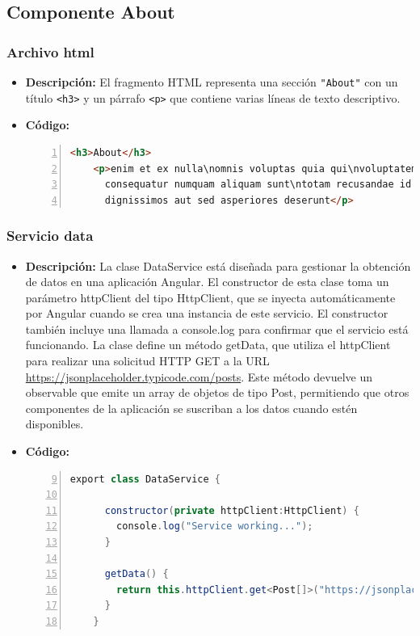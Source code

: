 \documentclass{article}
\begin{document}

  \subsection{Componente About}
  \subsubsection{Archivo html}
  \begin{itemize}
    \item \textbf{Descripción: }El fragmento HTML representa una sección \verb|"About"| con un título \verb|<h3>| y un párrafo \verb|<p>| que contiene 
    varias líneas de texto descriptivo.
    \item \textbf{Código: }
    \begin{lstlisting}[language=html, numbers=left, firstnumber=1, numberstyle=\color{orange}]
    <h3>About</h3>
    <p>enim et ex nulla\nomnis voluptas quia qui\nvoluptatem 
      consequatur numquam aliquam sunt\ntotam recusandae id 
      dignissimos aut sed asperiores deserunt</p>
    \end{lstlisting}
  \end{itemize}

  \subsubsection{Servicio data}
  \begin{itemize}
    \item \textbf{Descripción: }La clase DataService está diseñada para gestionar la obtención de datos en una 
    aplicación Angular. El constructor de esta clase toma un parámetro httpClient del tipo HttpClient, que se inyecta 
    automáticamente por Angular cuando se crea una instancia de este servicio. El constructor también incluye una 
    llamada a console.log para confirmar que el servicio está funcionando. La clase define un método getData, que 
    utiliza el httpClient para realizar una solicitud HTTP GET a la URL \url{https://jsonplaceholder.typicode.com/posts}. 
    Este método devuelve un observable que emite un array de objetos de tipo Post, permitiendo que otros componentes 
    de la aplicación se suscriban a los datos cuando estén disponibles.
    \newpage
    \item \textbf{Código: }
    \begin{lstlisting}[language=java, numbers=left, firstnumber=9, numberstyle=\color{black}]
    export class DataService {

      constructor(private httpClient:HttpClient) { 
        console.log("Service working...");
      }
      
      getData() {
        return this.httpClient.get<Post[]>("https://jsonplaceholder.typicode.com/posts");
      }
    }
    \end{lstlisting}
  \end{itemize}
\end{document}
